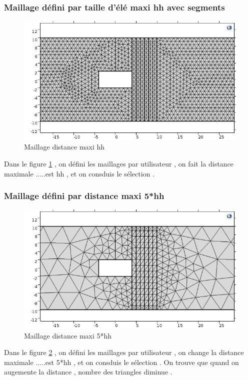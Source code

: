 \documentclass[a4paper,11pt]{report} %
\begin{document}
\subsubsection{Maillage défini par taille d'élé maxi hh avec segments}
\begin{figure}[!h]
\centering
\hspace*{0mm}\vfill
\begin{center} \includegraphics[width=1.\textwidth]{maillagehh1.jpg} \end{center}
\vfill\hspace*{0mm}
\caption{Maillage distance maxi hh  }
\label{maillage_hh}
\end{figure}
Dans le figure \ref{maillage_hh} , on défini les maillages par utilisateur , on fait la distance maximale .....est hh , et on consduis le sélection .
 
 
\subsubsection{Maillage défini par distance maxi 5*hh}
\begin{figure}[!h]
\centering
\hspace*{0mm}\vfill
\begin{center} \includegraphics[width=1.0\textwidth]{maillage5hh1.jpg} \end{center}
\vfill\hspace*{0mm}
\caption{Maillage distance maxi 5*hh  }
\label{maillage_5hh}
\end{figure}\pagebreak
Dans le figure \ref{maillage_5hh} , on défini les maillages par utilisateur , on change la distance maximale .....est 5*hh , et on consduis le sélection . On trouve que quand on augemente la distance , nombre des triangles diminue . 
\end{document}
